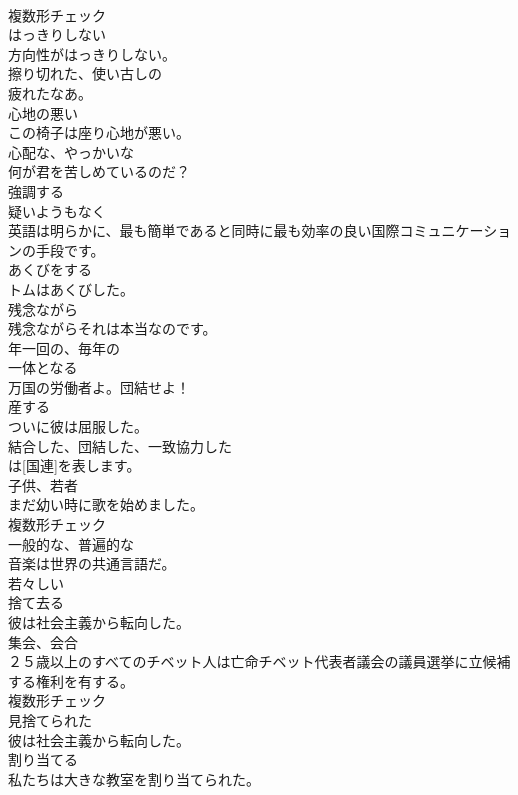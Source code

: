 \documentclass[8pt]{extreport}
\begin{document}
\begin{CJK}{UTF8}{min}
\\	複数形チェック
\\	[形容詞]	はっきりしない	
\\	方向性がはっきりしない。	
\\	[形容詞]	擦り切れた、使い古しの	
\\	疲れたなあ。	
\\	[形容詞]	心地の悪い	
\\	この椅子は座り心地が悪い。	
\\	[形容詞]	心配な、やっかいな	
\\	何が君を苦しめているのだ？	
\\	[動詞]	強調する	
\\	[副詞]	疑いようもなく	
\\	英語は明らかに、最も簡単であると同時に最も効率の良い国際コミュニケーションの手段です。	
\\	[動詞]	あくびをする	
\\	トムはあくびした。	
\\	[副詞]	残念ながら	
\\	残念ながらそれは本当なのです。	
\\	[形容詞]	年一回の、毎年の	
\\	[動詞]	一体となる	
\\	万国の労働者よ。団結せよ！	
\\	[動詞]	産する	
\\	ついに彼は屈服した。	
\\	[形容詞]	結合した、団結した、一致協力した	
\\	は[国連]を表します。	
\\	[名詞]	子供、若者	
\\	まだ幼い時に歌を始めました。	
\\	複数形チェック
\\	[形容詞]	一般的な、普遍的な	
\\	音楽は世界の共通言語だ。	
\\	[形容詞]	若々しい	
\\	[動詞]	捨て去る	
\\	彼は社会主義から転向した。	
\\	[名詞]	集会、会合	
\\	２５歳以上のすべてのチベット人は亡命チベット代表者議会の議員選挙に立候補する権利を有する。	
\\	複数形チェック
\\	[形容詞]	見捨てられた	
\\	彼は社会主義から転向した。	
\\	[動詞]	割り当てる	
\\	私たちは大きな教室を割り当てられた。	

\end{CJK}
\end{document}
